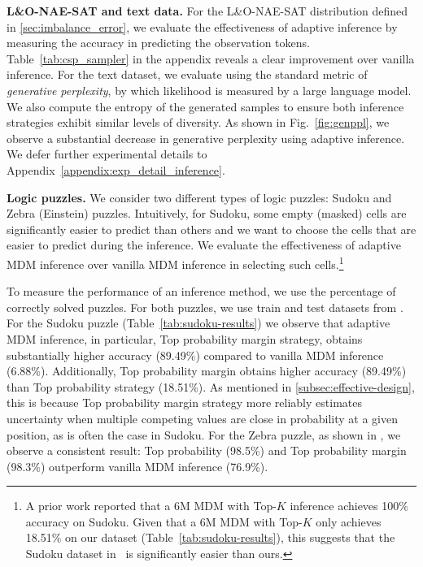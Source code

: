 \documentclass{article}
\newcommand{\topk}{Top-\(K\) }
\theoremstyle{plain}
\theoremstyle{definition}
\theoremstyle{remark}
\begin{document}
\textbf{L\&O-NAE-SAT and text data.} For the L\&O-NAE-SAT distribution defined in \cref{sec:imbalance_error}, we evaluate the effectiveness of adaptive inference by measuring the accuracy in predicting the observation tokens. Table~\ref{tab:csp_sampler} in the appendix reveals a clear improvement over vanilla inference. For the text dataset, we evaluate using the standard metric of \emph{generative perplexity}, by which likelihood is measured by a large language model. We also compute the entropy of the generated samples to ensure both inference strategies exhibit similar levels of diversity. As shown in Fig.~\ref{fig:genppl}, we observe a substantial decrease in generative perplexity using adaptive inference. We defer further experimental details to Appendix~\ref{appendix:exp_detail_inference}.

\textbf{Logic puzzles.} We consider two different types of logic puzzles: Sudoku and Zebra (Einstein) puzzles. Intuitively, for Sudoku, some empty (masked) cells are significantly easier to predict than others and we want to choose the cells that are easier to predict during the inference. We evaluate the effectiveness of adaptive MDM inference over vanilla MDM inference in selecting such cells.\footnote{A prior work \cite{ye2024beyond} reported that a $6$M MDM with \topk inference achieves 100\% accuracy on Sudoku. Given that a 6M MDM with \topk only achieves 18.51\% on our dataset (Table~\ref{tab:sudoku-results}), this suggests that the Sudoku dataset in~\cite{ye2024beyond} is significantly easier than ours.}

To measure the performance of an inference method, we use the percentage of correctly solved puzzles. For both puzzles, we use train and test datasets from \cite{shah2024causal}. For the Sudoku puzzle (Table~\ref{tab:sudoku-results}) we observe that adaptive MDM inference, in particular, Top probability margin strategy, obtains substantially higher accuracy (89.49\%) compared to vanilla MDM inference (6.88\%). Additionally, Top probability margin obtains higher accuracy (89.49\%) than Top probability strategy (18.51\%). As mentioned in \cref{subsec:effective-design}, this is because Top probability margin strategy more reliably estimates uncertainty when multiple competing values are close in probability at a given position, as is often the case in Sudoku. For the Zebra puzzle, as shown in , we observe a consistent result: Top probability (98.5\%) and Top probability margin (98.3\%) outperform vanilla MDM inference (76.9\%).
\end{document}
